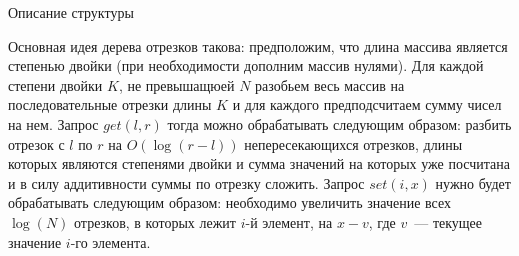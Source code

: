 ﻿\begin{section}{Описание структуры}

Основная идея дерева отрезков такова: предположим, что длина массива является степенью
двойки (при необходимости дополним массив нулями). Для каждой степени двойки $K$, не превышащюей $N$
разобьем весь массив на последовательные отрезки длины $K$ и для каждого предподсчитаем
сумму чисел на нем. Запрос $get(l, r)$ тогда можно обрабатывать следующим образом: разбить 
отрезок с $l$ по $r$ на $O(\log(r - l))$ непересекающихся отрезков, длины которых являются
степенями двойки и сумма значений на которых уже посчитана и в силу аддитивности суммы по
отрезку сложить. Запрос $set(i, x)$ нужно будет обрабатывать следующим образом: необходимо 
увеличить значение всех $\log(N)$ отрезков, в которых лежит $i$-й элемент, на $x - v$, где
$v$~--- текущее значение $i$-го элемента.

\end{section}